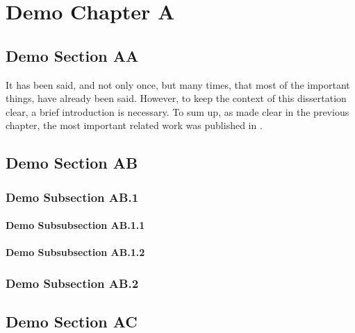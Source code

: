 

\chapter{Demo Chapter A}
\label{ch:ch2}
\lipsum[1-3]


\section{Demo Section AA}
\label{sec:ds2A}
It has been said, and not only once, but many times, that most of the important things, have already been said. However, to keep the context of this dissertation clear, a brief introduction is necessary. To sum up, as made clear in the previous chapter, the most important related work was published in \cite{demorefA:2000, demorefB:2001,demorefC:2002,demorefP:2003,demorefM:2004,demorefD:2005}.

\blindtext


\section{Demo Section AB}
\label{sec:ds2B}
\blindtext

\subsection{Demo Subsection AB.1}
\label{sub:dss2B1}
\blindmathpaper

\subsubsection{Demo Subsubsection AB.1.1}
\label{sub:dss2B11}
\blindtext

\subsubsection{Demo Subsubsection AB.1.2}
\label{sub:dss2B12}
\blindtext

\subsection{Demo Subsection AB.2}
\label{sub:dss2B2}
\blindmathpaper


\section{Demo Section AC}
\label{sec:ds2C}
\blindmathpaper
